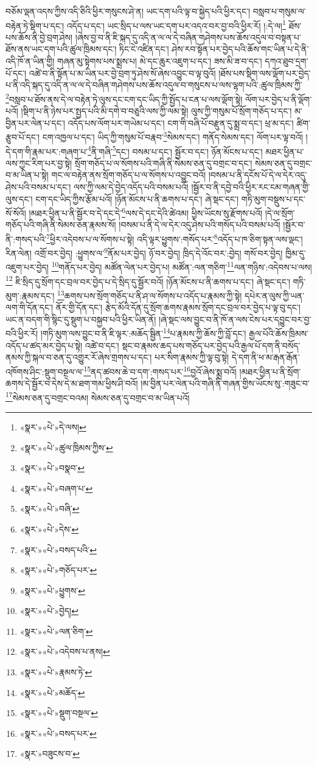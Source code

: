 བཅོམ་ལྡན་འདས་ཀྱིས་འདི་ཅིའི་ཕྱིར་གསུངས་ཤེ་ན། ཡང་དག་པའི་ལྟ་བ་སྐྱེད་པའི་ཕྱིར་དང་། བསླབ་པ་གསུམ་ལ་བརྟེན་ཏེ་སྡིག་པ་དང་། འདོད་པ་དང་། ཡང་སྲིད་པ་ལས་ཡང་དག་པར་འདའ་བར་བྱ་བའི་ཕྱིར་རོ། །:དེ་ལ།\footnote{«སྣར་»«པེ་»དེ་ལས།} ཐོས་པས་ཆོས་ནི་བྱེ་བྲག་ཤེས། །ཞེས་བྱ་བ་ནི་ཇི་སྐད་དུ་འདི་ན་ལ་ལ་དེ་བཞིན་གཤེགས་པས་ཆོས་འདུལ་བ་བསྟན་པ་ཐོས་ནས་ཡང་དག་པའི་ཚུལ་ཁྲིམས་དང་། ཏིང་ངེ་འཛིན་དང་། ཤེས་རབ་སྟོན་པར་བྱེད་པའི་ཆོས་གང་ཡིན་པ་དེ་ནི་འདི་ཁོ་ན་ཡིན་གྱི། གཞན་མུ་སྟེགས་པས་སྨྲས་པ། མེ་དང་ཆུར་འཇུག་པ་དང་། ཟས་མི་ཟ་བ་དང་། དཀའ་ཐུབ་དྲག་པོ་དང་། འཚེ་བ་ནི་སྟོན་པ་མ་ཡིན་པར་བྱེ་བྲག་ཏུ་ཤེས་སོ་ཞེས་འབྱུང་བ་ལྟ་བུའོ། །ཐོས་པས་སྡིག་ལས་ལྡོག་པར་བྱེད་པ་ནི་འདི་སྐད་དུ་འདི་ན་ལ་ལ་དེ་བཞིན་གཤེགས་པས་ཆོས་འདུལ་བ་གསུངས་པ་ལས་ལྷག་པའི་:ཚུལ་ཁྲིམས་ཀྱི་\footnote{«སྣར་»«པེ་»ཚུལ་ཁྲིམས་ཀྱིས་}བསླབ་པ་ཐོས་ནས་དེ་ལ་བརྟེན་ཏེ་ལུས་དང་ངག་དང་ཡིད་ཀྱི་སྤྱོད་པ་ངན་པ་ལས་ལྡོག་སྟེ། ལོག་པར་བྱེད་པ་ནི་ལྡོག་པའོ། །སྡིག་པ་ནི་ཉེས་པར་སྤྱད་པའི་མི་དགེ་བ་བཅུའི་ལས་ཀྱི་ལམ་སྟེ། ལུས་ཀྱི་གསུམ་པོ་སྲོག་གཅོད་པ་དང་། མ་བྱིན་པར་ལེན་པ་དང་། འདོད་པས་ལོག་པར་གཡེམ་པ་དང་། ངག་གི་བཞི་པོ་བརྫུན་དུ་སྨྲ་བ་དང་། ཕྲ་མ་དང་། ཚིག་རྩུབ་པོ་དང་། ངག་འཁྱལ་པ་དང་། ཡིད་ཀྱི་གསུམ་པོ་བརྣབ་\footnote{«སྣར་»«པེ་»བསྣབ་}སེམས་དང་། གནོད་སེམས་དང་། ལོག་པར་ལྟ་བའོ། །དེ་དག་གི་རྣམ་པར་:གཞག་པ་\footnote{«སྣར་»«པེ་»བཞག་པ་}ནི་གཞི་\footnote{«སྣར་»«པེ་»བཞི་}དང་། བསམ་པ་དང་། སྦྱོར་བ་དང་། ཉོན་མོངས་པ་དང་། མཐར་ཕྱིན་པ་ལས་ཀྱང་རིག་པར་བྱ་སྟེ། སྲོག་གཅོད་པ་ལ་སོགས་པའི་གཞི་ནི་སེམས་ཅན་དུ་བགྲང་བ་དང་། སེམས་ཅན་དུ་བགྲང་བ་མ་ཡིན་པ་སྟེ། གང་ལ་བརྟེན་ནས་སྲོག་གཅོད་པ་ལ་སོགས་པ་འབྱུང་བའོ། །བསམ་པ་ནི་དངོས་པོ་དེ་ལ་དེར་འདུ་ཤེས་པའི་བསམ་པ་དང་། ལས་ཀྱི་ལམ་དེ་བྱེད་འདོད་པའི་བསམ་པའོ། །སྦྱོར་བ་ནི་དབྱེ་བའི་ཕྱིར་རང་ངམ་གཞན་གྱི་ལུས་དང་། ངག་དང་ཡིད་ཀྱིས་རྩོམ་པའོ། །ཉོན་མོངས་པ་ནི་ཆགས་པ་དང་། ཞེ་སྡང་དང་། གཏི་མུག་བསྡུས་པ་དང་སོ་སོའོ། །མཐར་ཕྱིན་པ་ནི་སྦྱོར་བ་དེ་དང་དེ་\footnote{«སྣར་»«པེ་»དེས་}ལས་དེ་དང་དེའི་ཚེའམ། ཕྱིས་ཡོངས་སུ་རྫོགས་པའོ། །དེ་ལ་སྲོག་གཅོད་པའི་གཞི་ནི་སེམས་ཅན་རྣམས་སོ། །བསམ་པ་ནི་དེ་ལ་དེར་འདུ་ཤེས་པའི་གསོད་པའི་བསམ་པའོ། །སྦྱོར་བ་ནི་:གསད་པའི་\footnote{«སྣར་»«པེ་»བསད་པའི་}ཕྱིར་འདེབས་པ་ལ་སོགས་པ་སྟེ། འདི་ལྟར་ཕྱུགས་:གསོད་པར་\footnote{«སྣར་»«པེ་»གཅོད་པར་}འདོད་པ་ཁ་ཅིག་སྟན་ལས་ལྡང་། རིན་ལེན། འགྲོ་བར་བྱེད། :ཕྱུགས་ལ་\footnote{«སྣར་»«པེ་»ཕྱུགས་}ནོམ་པར་བྱེད། ཉོ་བར་བྱེད། ཁྲིད་དེ་འོང་བར་:བྱེད། གསོ་བར་བྱེད། ཁྱིམ་དུ་འཇུག་པར་བྱེད། \footnote{«སྣར་»«པེ་»བྱེད།  }གནོད་པར་བྱེད། མཚོན་ལེན་པར་བྱེད་པ། མཚོན་:ལན་གཅིག་\footnote{«སྣར་»«པེ་»ལན་ཅིག་}ལན་གཉིས་:འདེབས་པ་ལས།\footnote{«སྣར་»«པེ་»འདེབས་པ་ནས།} ཇི་སྲིད་དུ་སྲོག་དང་བྲལ་བར་བྱེད་པ་དེ་སྲིད་དུ་སྦྱོར་བའོ། །ཉོན་མོངས་པ་ནི་ཆགས་པ་དང་། ཞེ་སྡང་དང་། གཏི་མུག་:རྣམས་དང་། \footnote{«སྣར་»«པེ་»རྣམས་ཏེ་}ཆགས་པས་སྲོག་གཅོད་པ་ནི་ཤ་ལ་སོགས་པ་འདོད་པ་རྣམས་ཀྱི་སྟེ། དཔེར་ན་ལུས་ཀྱི་ཡན་ལག་གི་དོན་དང་། ནོར་གྱི་དོན་དང་། རྩེད་མོའི་དོན་དུ་སྲོག་ཆགས་རྣམས་སྲོག་དང་བྲལ་བར་བྱེད་པ་ལྟ་བུ་དང་། ཡང་ན་བདག་གི་སྙིང་དུ་སྡུག་པ་བསྐྱབ་པའི་ཕྱིར་ཡིན་ནོ། །ཞེ་སྡང་ལས་བྱུང་བ་ནི་ཁོ་ན་ལས་ངེས་པར་དབྱུང་བར་བྱ་བའི་ཕྱིར་རོ། །གཏི་མུག་ལས་བྱུང་བ་ནི་ཇི་ལྟར་:མཆོད་སྦྱིན་\footnote{«སྣར་»«པེ་»མཆོད་}པ་རྣམས་ཀྱི་ཆོས་ཀྱི་བློ་དང་། རྒྱལ་པོའི་ཆོས་ཁྲིམས་འདོད་པ་ཚད་མར་བྱེད་པ་སྟེ། འཚེ་བ་དང་། སྡང་བ་རྣམས་ཆད་པས་གཅོད་པར་བྱེད་པའི་རྒྱལ་པོ་དག་ནི་བསོད་ནམས་ཀྱི་སྐལ་བ་ཅན་དུ་འགྱུར་རོ་ཞེས་གྲགས་པ་དང་། པར་སིག་རྣམས་ཀྱི་ལྟ་བུ་སྟེ། དེ་དག་ནི་ཕ་མ་རྒན་རྒོན་འཁོགས་ཤིང་:སྡུག་བསྔལ་ལ་\footnote{«སྣར་»«པེ་»སྡུག་བསྔལ་}ནད་ཚབས་ཆེ་བ་དག་:གསད་པར་\footnote{«སྣར་»«པེ་»བསད་པར་}བྱའོ་ཞེས་སྨྲ་བའོ། །མཐར་ཕྱིན་པ་ནི་སྲོག་ཆགས་དེ་སྦྱོར་བ་དེས་དེ་མ་ཐག་གམ་ཕྱིས་ཤི་བའོ། །མ་བྱིན་པར་ལེན་པའི་གཞི་ནི་གཞན་གྱིས་ཡོངས་སུ་:གཟུང་བ་\footnote{«སྣར་»བཟུངས་བ་}སེམས་ཅན་དུ་བགྲང་བའམ། སེམས་ཅན་དུ་བགྲང་བ་མ་ཡིན་པའོ། 